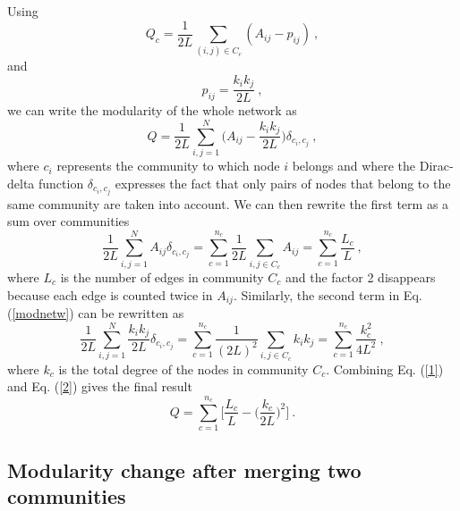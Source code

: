 \documentclass[11 pt , letterpaper , twoside , openright]{book}
\begin{document}
Using \cite{Albert2016}
\begin{equation}
	Q_c = \frac{1}{2L}\sum_{(i,j) \in C_c} (A_{ij} - p_{ij}) \ ,
\end{equation}
and \cite{Albert2016}
\begin{equation}
	p_{ij} = \frac{k_ik_j}{2L} \ ,
\end{equation}
we can write the modularity of the whole network as \cite{Albert2016}
\begin{equation}\label{modnetw}
	Q = \frac{1}{2L}\sum_{i, j = 1}^N \bigg(A_{ij} - \frac{k_ik_j}{2L}\bigg) \delta_{c_i, c_j} \ ,
\end{equation}
where $c_i$ represents the community to which node $i$ belongs and where the Dirac-delta function $\delta_{c_i, c_j}$ expresses the fact that only pairs of nodes that belong to the same community are taken into account. We can then rewrite the first term as a sum over communities \cite{Albert2016}
\begin{equation}\label{1}
	\frac{1}{2L}\sum_{i, j = 1}^N A_{ij}\delta_{c_i, c_j} = \sum_{c=1}^{n_c}\frac{1}{2L}\sum_{i, j \in C_c} A_{ij} = \sum_{c=1}^{n_c}\frac{L_c}{L} \ ,
\end{equation}
where $L_c$ is the number of edges in community $C_c$ and the factor 2 disappears because each edge is counted twice in $A_{ij}$. Similarly, the second term in Eq. (\ref{modnetw}) can be rewritten as \cite{Albert2016}
\begin{equation}\label{2}
	\frac{1}{2L}\sum_{i, j = 1}^N \frac{k_ik_j}{2L} \delta_{c_i, c_j} = \sum_{c=1}^{n_c}\frac{1}{(2L)^2}\sum_{i, j \in C_c} k_ik_j = \sum_{c=1}^{n_c}\frac{k_c^2}{4L^2} \ ,
\end{equation}
where $k_c$ is the total degree of the nodes in community $C_c$. Combining Eq. (\ref{1}) and Eq. (\ref{2}) gives the final result \cite{Albert2016}
\begin{equation}\label{Qfin}
	Q = \sum_{c = 1}^{n_c}\bigg[\frac{L_c}{L} - \bigg(\frac{k_c}{2L}\bigg)^2 \bigg] \ .
\end{equation}

\subsection{Modularity change after merging two communities}\label{modchange}
\end{document}
